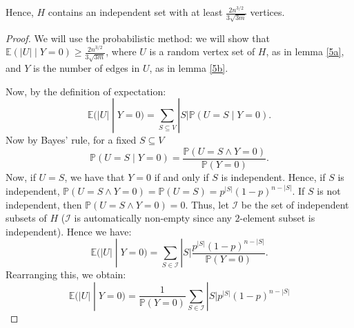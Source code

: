 \documentclass{unswmaths}
\begin{document}
\begin{corollary}[Part (c)]
    Hence, $H$ contains an independent set with at least $\frac{2n^{3/2}}{3\sqrt{3m}}$
    vertices.
\end{corollary}
\begin{proof}
    We will use the probabilistic method: we will
    show that $\mathbb{E}(|U|\;|\;Y = 0) \geq \frac{2n^{3/2}}{3\sqrt{3m}}$,
    where $U$ is a random vertex set of $H$, as in lemma
    \ref{5a}, and $Y$ is the number
    of edges in $U$, as in lemma \ref{5b}.
    
    Now, by the definition of expectation:
    \begin{equation*}
        \mathbb{E}(|U|\;|\;Y = 0) = \sum_{S \subseteq V} |S|\mathbb{P}(U=S\;|\;Y = 0).
    \end{equation*}
    Now by Bayes' rule, for a fixed $S \subseteq V$
    \begin{equation*}
        \mathbb{P}(U=S\;|\;Y=0) = \frac{\mathbb{P}(U=S\wedge Y = 0)}{\mathbb{P}(Y=0)}.
    \end{equation*}
    Now, if $U = S$, we have that 
    $Y = 0$ if and only if $S$ is independent.
    Hence, if $S$ is independent, $\mathbb{P}(U=S\wedge Y = 0) = \mathbb{P}(U=S) = p^{|S|}(1-p)^{n-|S|}$.
    If $S$ is not independent, then $\mathbb{P}(U=S\wedge Y=0) = 0$.
    Thus, 
    let $\mathcal{I}$ be the set of independent
    subsets of $H$ ($\mathcal{I}$ is automatically non-empty since any $2$-element
    subset is independent). Hence we have:
    \begin{equation*}
        \mathbb{E}(|U|\;|\;Y=0) = \sum_{S \in\mathcal{I}} |S| \frac{p^{|S|}(1-p)^{n-|S|}}{\mathbb{P}(Y=0)}.
    \end{equation*} 
    Rearranging this, we obtain:
    \begin{equation*}
        \mathbb{E}(|U|\;|\;Y=0) = \frac{1}{\mathbb{P}(Y=0)}\sum_{S \in \mathcal{I}} |S|p^{|S|}(1-p)^{n-|S|}
    \end{equation*}
    

\end{proof}
\end{document}
